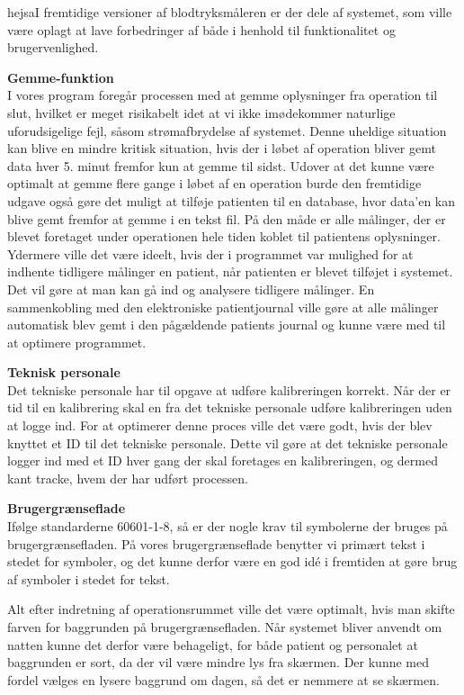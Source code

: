 hejsaI fremtidige versioner af blodtryksmåleren er der dele af systemet, som ville være oplagt at lave forbedringer af både i henhold til funktionalitet og brugervenlighed. 

\textbf{Gemme-funktion}
\\I vores program foregår processen med at gemme oplysninger fra operation til slut, hvilket er meget risikabelt idet at vi ikke imødekommer naturlige uforudsigelige fejl, såsom strømafbrydelse af systemet. Denne uheldige situation kan blive en mindre kritisk situation, hvis der i løbet af operation bliver gemt data hver 5. minut fremfor kun at gemme til sidst.
Udover at det kunne være optimalt at gemme flere gange i løbet af en operation burde den fremtidige udgave også gøre det muligt at tilføje patienten til en database, hvor data’en kan blive gemt fremfor at gemme i en tekst fil. På den måde er alle målinger, der er blevet foretaget under operationen hele tiden koblet til patientens oplysninger. Ydermere ville det være ideelt, hvis der i programmet var mulighed for at indhente tidligere målinger en patient, når patienten er blevet tilføjet i systemet. Det vil gøre at man kan gå ind og analysere tidligere målinger. En sammenkobling med den elektroniske patientjournal ville gøre at alle målinger automatisk blev gemt i den pågældende patients journal og kunne være med til at optimere programmet.

\textbf{Teknisk personale}
\\Det tekniske personale har til opgave at udføre kalibreringen korrekt. Når der er tid til en kalibrering skal en fra det tekniske personale udføre kalibreringen uden at logge ind. For at optimerer denne proces ville det være godt, hvis der blev knyttet et ID til det tekniske personale. Dette vil gøre at det tekniske personale logger ind med et ID hver gang der skal foretages en kalibreringen, og dermed kant tracke, hvem der har udført processen.

\textbf{Brugergrænseflade}
\\Ifølge standarderne 60601-1-8, så er der nogle krav til symbolerne der bruges på brugergrænsefladen. På vores brugergrænseflade benytter vi primært tekst i stedet for symboler, og det kunne derfor være en god idé i fremtiden at gøre brug af symboler i stedet for tekst.

Alt efter indretning af operationsrummet ville det være optimalt, hvis man skifte farven for baggrunden på brugergrænsefladen. Når systemet bliver anvendt om natten kunne det derfor være behageligt, for både patient og personalet at baggrunden er sort, da der vil være mindre lys fra skærmen. Der kunne med fordel vælges en lysere baggrund om dagen, så det er nemmere at se skærmen.


